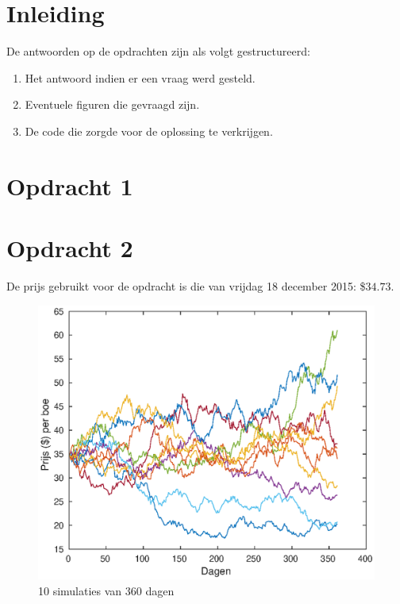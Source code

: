 \documentclass[11pt,a4paper]{article}
\begin{document}
\begin{titlepage}

\vfill %

\end{titlepage}
\section*{Inleiding}
De antwoorden op de opdrachten zijn als volgt gestructureerd:
\begin{enumerate}
\item Het antwoord indien er een vraag werd gesteld.
\item Eventuele figuren die gevraagd zijn.
\item De code die zorgde voor de oplossing te verkrijgen.
\end{enumerate}
\section*{Opdracht 1}



\section*{Opdracht 2}
De prijs gebruikt voor de opdracht is die van vrijdag 18 december 2015: \$$34.73$.

\begin{figure}[H]
\centering
\includegraphics[scale=0.75]{opdracht2}
\caption{10 simulaties van 360 dagen}
\end{figure}
\end{document}
